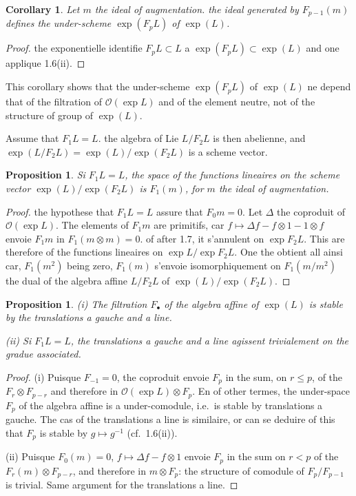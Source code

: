 \documentclass[11pt,a4paper]{article}
\theoremstyle{plain}
\newtheorem{proposition}[theorem]{Proposition}
\newtheorem{corollary}[theorem]{Corollary}
\theoremstyle{definition}
\begin{document}
\begin{corollary}
\label{cor:1.7}
Let $m$ the ideal of augmentation. the ideal generated by $F_{p-1}(m)$ defines the under-scheme $\exp(F_pL)$ of $\exp(L)$.
\end{corollary}

\begin{proof}
the exponentielle identifie $F_pL \subset L$ a $\exp(F_pL) \subset \exp(L)$ and one applique 1.6(ii).
\end{proof}

This corollary shows that the under-scheme $\exp(F_pL)$ of $\exp(L)$ ne depend that of the filtration of $\mathcal{O}(\exp L)$ and of the element neutre, not of the structure of group of $\exp(L)$.

Assume that $F_1L = L$. the algebra of Lie $L/F_2L$ is then abelienne, and $\exp(L/F_2L) = \exp(L)/\exp(F_2L)$ is a scheme vector.

\begin{proposition}
\label{prop:1.8}
Si $F_1L = L$, the space of the functions lineaires on the scheme vector $\exp(L)/\exp(F_2L)$ is $F_1(m)$, for $m$ the ideal of augmentation.
\end{proposition}

\begin{proof}
the hypothese that $F_1L = L$ assure that $F_0m = 0$. Let $\Delta$ the coproduit of $\mathcal{O}(\exp L)$. The elements of $F_1m$ are primitifs, car $f \mapsto \Delta f - f \otimes 1 - 1 \otimes f$ envoie $F_1m$ in $F_1(m \otimes m) = 0$. of after 1.7, it s'annulent on $\exp F_2L$. This are therefore of the functions lineaires on $\exp L/\exp F_2L$. One the obtient all ainsi car, $F_1(m^2)$ being zero, $F_1(m)$ s'envoie isomorphiquement on $F_1(m/m^2)$ the dual of the algebra affine $L/F_2L$ of $\exp(L)/\exp(F_2L)$.
\end{proof}

\begin{proposition}
\label{prop:1.9}
\emph{(i)} The filtration $F_{\bullet}$ of the algebra affine of $\exp(L)$ is stable by the translations a gauche and a line.

\emph{(ii)} Si $F_1L = L$, the translations a gauche and a line agissent trivialement on the gradue associated.
\end{proposition}

\begin{proof}
(i) Puisque $F_{-1} = 0$, the coproduit envoie $F_p$ in the sum, on $r \leq p$, of the $F_r \otimes F_{p-r}$ and therefore in $\mathcal{O}(\exp L) \otimes F_p$. En of other termes, the under-space $F_p$ of the algebra affine is a under-comodule, i.e.~is stable by translations a gauche. The cas of the translations a line is similaire, or can se deduire of this that $F_p$ is stable by $g \mapsto g^{-1}$ (cf.~1.6(ii)).

(ii) Puisque $F_0(m) = 0$, $f \mapsto \Delta f - f \otimes 1$ envoie $F_p$ in the sum on $r < p$ of the $F_r(m) \otimes F_{p-r}$, and therefore in $m \otimes F_p$: the structure of comodule of $F_p/F_{p-1}$ is trivial. Same argument for the translations a line.
\end{proof}
\end{document}
